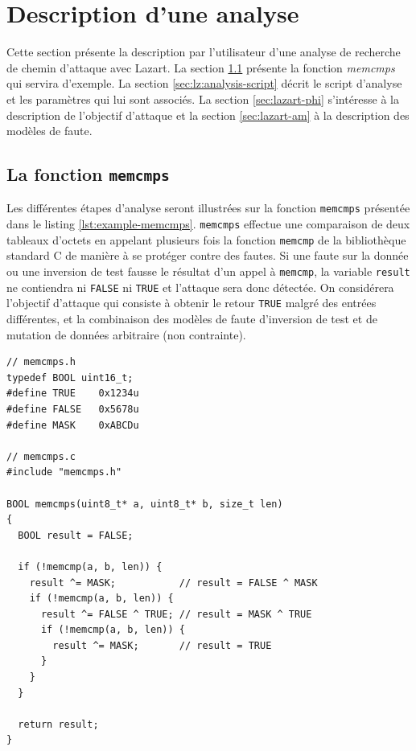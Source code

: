     \section{Description d'une analyse}
    \label{sec:lazart:descr}
    
        Cette section présente la description par l'utilisateur d'une analyse de recherche de chemin d'attaque avec Lazart.
        La section \ref{sec:lz:memcmps} présente la fonction \textit{memcmps} qui servira d'exemple.
        La section \ref{sec:lz:analysis-script} décrit le script d'analyse et les paramètres qui lui sont associés.
        La section \ref{sec:lazart-phi} s'intéresse à la description de l'objectif d'attaque et la section \ref{sec:lazart-am} à la description des modèles de faute.
        
        \subsection{La fonction \texttt{memcmps}}
        \label{sec:lz:memcmps}
        
            Les différentes étapes d'analyse  seront illustrées sur la fonction \texttt{memcmps} présentée dans le listing \ref{lst:example-memcmps}. 
            \texttt{memcmps} effectue une comparaison de deux tableaux d'octets en appelant plusieurs fois la fonction \texttt{memcmp} de la bibliothèque standard C de manière à se protéger contre des fautes. Si une faute sur la donnée ou une inversion de test fausse le résultat d'un appel à \texttt{memcmp}, la variable \texttt{result} ne contiendra ni \texttt{FALSE} ni \texttt{TRUE} et l'attaque sera donc détectée. 
            On considérera l'objectif d'attaque qui consiste à obtenir le retour \texttt{TRUE} malgré des entrées différentes, et la combinaison des modèles de faute d'inversion de test et de mutation de données arbitraire (non contrainte). 
        
\begin{lstlisting}    
// memcmps.h
typedef BOOL uint16_t;
#define TRUE    0x1234u
#define FALSE   0x5678u
#define MASK    0xABCDu

// memcmps.c
#include "memcmps.h"

BOOL memcmps(uint8_t* a, uint8_t* b, size_t len)
{
  BOOL result = FALSE;
  
  if (!memcmp(a, b, len)) {
    result ^= MASK;           // result = FALSE ^ MASK
    if (!memcmp(a, b, len)) {
      result ^= FALSE ^ TRUE; // result = MASK ^ TRUE
      if (!memcmp(a, b, len)) {
        result ^= MASK;       // result = TRUE
      }
    }
  }

  return result;
}
\end{lstlisting}
        
